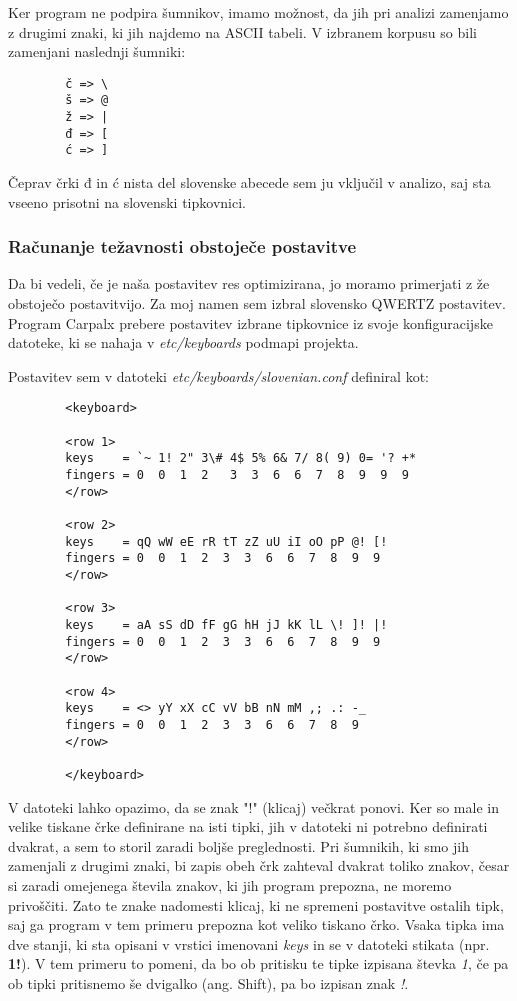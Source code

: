     Ker program ne podpira šumnikov, imamo možnost, da jih pri analizi zamenjamo z drugimi znaki, ki jih najdemo na ASCII tabeli.
    V izbranem korpusu so bili zamenjani naslednji šumniki:

    \begin{verbatim}
        č => \
        š => @
        ž => |
        đ => [
        ć => ]
    \end{verbatim}

    Čeprav črki đ in ć nista del slovenske abecede sem ju vključil v analizo, saj sta vseeno prisotni na slovenski tipkovnici.

    \subsubsection{Računanje težavnosti obstoječe postavitve}

    Da bi vedeli, če je naša postavitev res optimizirana, jo moramo primerjati z že obstoječo postavitvijo.
    Za moj namen sem izbral slovensko QWERTZ postavitev.
    Program Carpalx prebere postavitev izbrane tipkovnice iz svoje konfiguracijske datoteke, ki se nahaja v \emph{etc/keyboards} podmapi projekta.

    Postavitev sem v datoteki \emph{etc/keyboards/slovenian.conf} definiral kot:

    \begin{verbatim}
        <keyboard>

        <row 1>
        keys    = `~ 1! 2" 3\# 4$ 5% 6& 7/ 8( 9) 0= '? +*
        fingers = 0  0  1  2   3  3  6  6  7  8  9  9  9
        </row>

        <row 2>
        keys    = qQ wW eE rR tT zZ uU iI oO pP @! [!
        fingers = 0  0  1  2  3  3  6  6  7  8  9  9
        </row>

        <row 3>
        keys    = aA sS dD fF gG hH jJ kK lL \! ]! |!
        fingers = 0  0  1  2  3  3  6  6  7  8  9  9
        </row>

        <row 4>
        keys    = <> yY xX cC vV bB nN mM ,; .: -_
        fingers = 0  0  1  2  3  3  6  6  7  8  9
        </row>

        </keyboard>
    \end{verbatim}

    \newpage
    V datoteki lahko opazimo, da se znak "!" (klicaj) večkrat ponovi.
    Ker so male in velike tiskane črke definirane na isti tipki, jih v datoteki ni potrebno definirati dvakrat, a sem to storil zaradi boljše preglednosti.
    Pri šumnikih, ki smo jih zamenjali z drugimi znaki, bi zapis obeh črk zahteval dvakrat toliko znakov, česar si zaradi omejenega števila znakov, ki jih program prepozna, ne moremo privoščiti.
    Zato te znake nadomesti klicaj, ki ne spremeni postavitve ostalih tipk, saj ga program v tem primeru prepozna kot veliko tiskano črko.
    Vsaka tipka ima dve stanji, ki sta opisani v vrstici imenovani \emph{keys} in se v datoteki stikata (npr. \textbf{1!}).
    V tem primeru to pomeni, da bo ob pritisku te tipke izpisana števka \emph{1}, če pa ob tipki pritisnemo še dvigalko (ang. Shift),
    pa bo izpisan znak \emph{!}.

